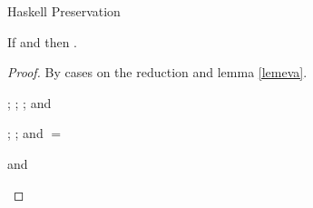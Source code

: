 \begin{theorem}{Haskell Preservation}

\label{thmpnh}

If \judeh{\env}{\first{\varexph}}{\first{\vartyh}} and \redruleh{\first{\varexph}}{\second{\varexph}} then \judeh{\env}{\second{\varexph}}{\first{\vartyh}}.

\begin{proof}

By cases on the reduction \redruleh{\first{\varexph}}{\second{\varexph}} and lemma \ref{lemeva}.


\begin{case}{\osfapph}

\pnpremise
{\judeh{\env}{\osfapplh}{\second{\vartyh}}}
\pntypes
{
\judeh{\env}{\expfabss{\first{\varvarh}}{\first{\vartyh}}{\first{\varexph}}}{\tyfun{\first{\vartyh}}{\second{\vartyh}}};
\judeh{\envexte{\env}{\first{\varvarh}}{\first{\vartyh}}}{\first{\varexph}}{\second{\vartyh}};
\judeh{\env}{\second{\varexph}}{\first{\vartyh}}; and
\judeh{\envexte{\env}{\first{\varvarh}}{\first{\vartyh}}}{\first{\varvarh}}{\first{\vartyh}}
}
\pnexpsubst
{\judeh{\env}{\osfapprh}{\second{\vartyh}}}

\end{case}


\begin{case}{\ostapp}

\pnpremise
{\judeh{\env}{\ostappl}{\second{\vartyh}}}
\pntypes
{
\judeh{\env}{\exptabs{\first{\tyvarh}}{\first{\varexph}}}{\tyfor{\first{\tyvarh}}{\third{\vartyh}}};
\judeh{\envextt{\env}{\first{\tyvarh}}}{\first{\varexph}}{\third{\vartyh}}; and
\second{\vartyh} $=$ \tysubst{\third{\vartyh}}{\first{\vartyh}}{\first{\tyvarh}}
}
\pntysubst
{\judeh{\env}{\ostappr}{\tysubst{\third{\vartyh}}{\first{\vartyh}}{\first{\tyvarh}}}}

\end{case}


\begin{case}{\osfix}

\pnpremise
{\judeh{\env}{\osfixl}{\second{\vartyh}}}
\pntypes
{
\judeh{\env}{(\expfabss{\first{\varvarh}}{\first{\vartyh}}{\first{\varexph}})}{\tyfun{\first{\vartyh}}{\second{\vartyh}}} and
\judeh{\envexte{\env}{\first{\varvarh}}{\first{\vartyh}}}{\first{\varexph}}{\second{\vartyh}}
}
\pnexpsubst
{\judeh{\env}{\osfixr}{\second{\vartyh}}}


\end{case}
\end{proof}
\end{theorem}
